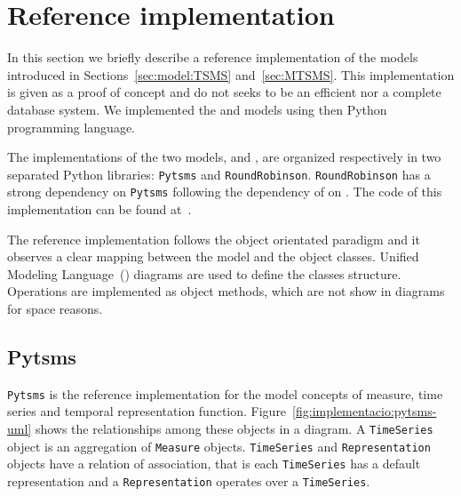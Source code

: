 \section{Reference implementation}
\label{sec:implementation}

In this section we briefly describe a reference implementation of the
models introduced in Sections~\ref{sec:model:TSMS}
and~\ref{sec:MTSMS}. This implementation is given as a proof of
concept and do not seeks to be an efficient nor a complete database
system. We implemented the  and  models using
then Python~\cite{python:doc2} programming language.

The implementations of the two models,  and ,
are organized respectively in two separated Python libraries:
\texttt{Pytsms} and \texttt{RoundRobinson}.  \texttt{RoundRobinson}
has a strong dependency on \texttt{Pytsms} following the dependency of
 on .  The code of this implementation can be
found at~\cite{llusa:roundrobinson}.

The reference implementation follows the object orientated paradigm
and it observes a clear mapping between the model and the object
classes. Unified Modeling Language~() diagrams are used to
define the classes structure.  Operations are implemented as object
methods, which are not show in  diagrams for space reasons.


\subsection{Pytsms}

\texttt{Pytsms} is the reference implementation for the model concepts
of measure, time series and temporal representation function.
Figure~\ref{fig:implementacio:pytsms-uml} shows the relationships
among these objects in a  diagram. A \texttt{TimeSeries}
object is an aggregation of \texttt{Measure}
objects. \texttt{TimeSeries} and \texttt{Representation} objects have
a relation of association, that is each \texttt{TimeSeries} has a
default representation and a \texttt{Representation} operates over a
\texttt{TimeSeries}.


